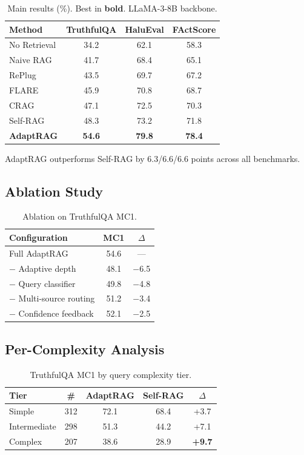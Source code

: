 \documentclass[11pt]{article}
\begin{document}
\begin{table}[h]
\centering
\caption{Main results (\%). Best in \textbf{bold}. LLaMA-3-8B backbone.}
\begin{tabular}{lccc}
\toprule
\textbf{Method} & \textbf{TruthfulQA} & \textbf{HaluEval} & \textbf{FActScore} \\
\midrule
No Retrieval & 34.2 & 62.1 & 58.3 \\
Naive RAG & 41.7 & 68.4 & 65.1 \\
RePlug & 43.5 & 69.7 & 67.2 \\
FLARE & 45.9 & 70.8 & 68.7 \\
CRAG & 47.1 & 72.5 & 70.3 \\
Self-RAG & 48.3 & 73.2 & 71.8 \\
\textbf{AdaptRAG} & \textbf{54.6} & \textbf{79.8} & \textbf{78.4} \\
\bottomrule
\end{tabular}
\end{table}

AdaptRAG outperforms Self-RAG by 6.3/6.6/6.6 points across all benchmarks.

\subsection{Ablation Study}

\begin{table}[h]
\centering
\caption{Ablation on TruthfulQA MC1.}
\begin{tabular}{lcc}
\toprule
\textbf{Configuration} & \textbf{MC1} & \textbf{$\Delta$} \\
\midrule
Full AdaptRAG & 54.6 & --- \\
$-$ Adaptive depth & 48.1 & $-$6.5 \\
$-$ Query classifier & 49.8 & $-$4.8 \\
$-$ Multi-source routing & 51.2 & $-$3.4 \\
$-$ Confidence feedback & 52.1 & $-$2.5 \\
\bottomrule
\end{tabular}
\end{table}

\subsection{Per-Complexity Analysis}

\begin{table}[h]
\centering
\caption{TruthfulQA MC1 by query complexity tier.}
\begin{tabular}{lcccc}
\toprule
\textbf{Tier} & \textbf{\#} & \textbf{AdaptRAG} & \textbf{Self-RAG} & \textbf{$\Delta$} \\
\midrule
Simple & 312 & 72.1 & 68.4 & +3.7 \\
Intermediate & 298 & 51.3 & 44.2 & +7.1 \\
Complex & 207 & 38.6 & 28.9 & \textbf{+9.7} \\
\bottomrule
\end{tabular}
\end{table}
\end{document}
